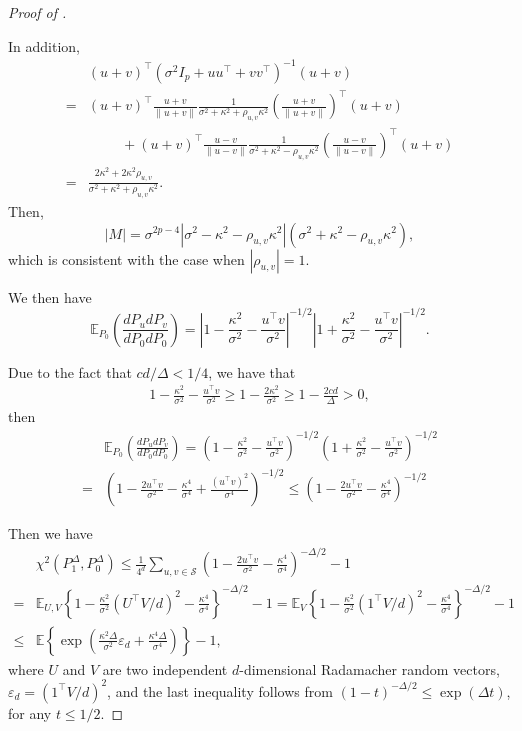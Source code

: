 \documentclass[twoside]{article}
\begin{document}
\begin{proof}[Proof of ]
\begin{itemize}
		In addition, 
		\begin{align*}
			& (u+v)^{\top} \left(\sigma^2 I_p + uu^{\top} + vv^{\top}\right)^{-1}(u+v) \\
			= & (u+v)^{\top}	\frac{u+v}{\|u+v\|} \frac{1}{\sigma^2 + \kappa^2 + \rho_{u, v}\kappa^2}\left(\frac{u+v}{\|u+v\|}\right)^{\top} (u+v) \\
			&\hspace{1cm} + (u+v)^{\top}	\frac{u-v}{\|u-v\|} \frac{1}{\sigma^2 + \kappa^2 - \rho_{u, v}\kappa^2}\left(\frac{u-v}{\|u-v\|}\right)^{\top} (u+v)  \\
			= & \frac{2\kappa^2 + 2\kappa^2 \rho_{u, v}}{\sigma^2 + \kappa^2 + \rho_{u, v}\kappa^2}.
		\end{align*}
		Then,
		\[
			|M| = \sigma^{2p-4} |\sigma^2 - \kappa^2 - \rho_{u, v}\kappa^2| (\sigma^2 + \kappa^2 - \rho_{u, v}\kappa^2),
		\]
		which is consistent with the case when $|\rho_{u, v}| = 1$.
	\end{itemize}

We then have
	\[
		\mathbb{E}_{P_0} \left(\frac{dP_u dP_v}{dP_0 dP_0}\right) = \left|1 - \frac{\kappa^2}{\sigma^2} - \frac{u^{\top}v}{\sigma^2}\right|^{-1/2} \left|1 + \frac{\kappa^2}{\sigma^2} - \frac{u^{\top}v}{\sigma^2}\right|^{-1/2}.
	\]
	
Due to the fact that $cd/\Delta < 1/4$, we have that
	\begin{align*}
		1 - \frac{\kappa^2}{\sigma^2} - \frac{u^{\top}v}{\sigma^2} \geq 1 - \frac{2\kappa^2}{\sigma^2} \geq 1 - \frac{2cd}{\Delta} > 0,
	\end{align*}
	then
	\begin{align*}
		& \mathbb{E}_{P_0} \left(\frac{dP_u dP_v}{dP_0 dP_0}\right) = \left(1 - \frac{\kappa^2}{\sigma^2} - \frac{u^{\top}v}{\sigma^2}\right)^{-1/2} \left(1 + \frac{\kappa^2}{\sigma^2} - \frac{u^{\top}v}{\sigma^2}\right)^{-1/2} \\
		= & \left(1 - \frac{2u^{\top}v}{\sigma^2} - \frac{\kappa^4}{\sigma^4} + \frac{(u^{\top}v)^2}{\sigma^4}\right)^{-1/2} \leq \left(1 - \frac{2u^{\top}v}{\sigma^2} - \frac{\kappa^4}{\sigma^4}\right)^{-1/2}
	\end{align*}
	
Then we have
	\begin{align*}
		& \chi^2(P_1^{\Delta}, P_0^{\Delta}) \leq \frac{1}{4^d} \sum_{u, v \in \mathcal{S}} \left(1 - \frac{2u^{\top}v}{\sigma^2} - \frac{\kappa^4}{\sigma^4}\right)^{-\Delta/2} - 1 \\
		= & \mathbb{E}_{U, V} \left\{1 - \frac{\kappa^2}{\sigma^2} (U^{\top}V/d)^2 - \frac{\kappa^4}{\sigma^4}\right\}^{-\Delta/2} - 1 = \mathbb{E}_{V} \left\{1 - \frac{\kappa^2}{\sigma^2} (1^{\top}V/d)^2 - \frac{\kappa^4}{\sigma^4}\right\}^{-\Delta/2} - 1 \\
		\leq & \mathbb{E} \left\{\exp\left(\frac{\kappa^2 \Delta}{\sigma^2} \varepsilon_d + \frac{\kappa^4 \Delta}{\sigma^4}\right)\right\} - 1,
	\end{align*}
	where $U$ and $V$ are two independent $d$-dimensional Radamacher random vectors, $\varepsilon_d = (1^{\top}V/d)^2$, and the last inequality follows from $(1-t)^{-\Delta/2} \leq \exp(\Delta t)$, for any $t \leq 1/2$.
	

\end{proof}
\end{document}
